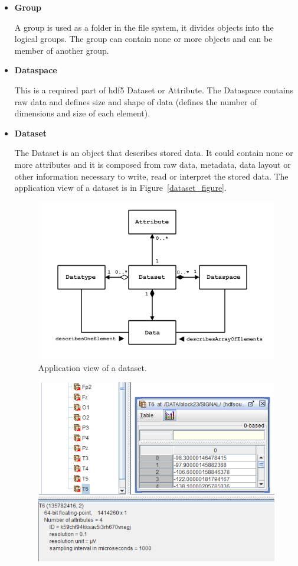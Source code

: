 \begin{itemize}
	\item \textbf{Group}
	
A group is used as a folder in the file system, it divides objects into the logical groups. The group can contain none or more objects and can be member of another group.
\newpage
	\item \textbf{Dataspace}
	
This is a required part of \gls{hdf5} Dataset or Attribute. The Dataspace contains raw data and defines size and shape of data (defines the number of dimensions and size of each element).
	\item \textbf{Dataset}
	
	The Dataset is an object that describes stored data. It could contain none or more attributes and it is composed from raw data, metadata, data layout or other information necessary to write, read or interpret the stored data. The application view of a dataset is in Figure~\ref{dataset_figure}.	
	\begin{figure}[h]
		\begin{center}
			\includegraphics[scale=0.6]{obrazky/dataset.jpg}
			\caption{Application view of a dataset. \cite{hdf}}
			\label{dataset}
		\end{center}
	\end{figure}
		\begin{figure}[h]
			\begin{center}
				\includegraphics[scale=0.7]{obrazky/dataset-with-att.PNG}

\end{center}
\end{figure}
\end{itemize}

